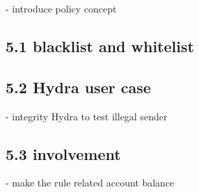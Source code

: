 - introduce policy concept
\subsection*{5.1 blacklist and whitelist}

\subsection*{5.2 Hydra user case}
- integrity Hydra to test illegal sender

\subsection*{5.3 involvement}
- make the rule related account balance 



